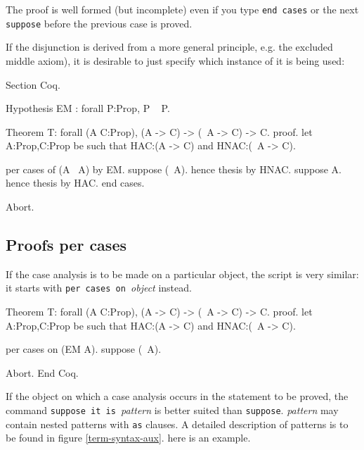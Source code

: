 The proof is well formed (but incomplete) even if you type {\tt end
 cases} or the next {\tt suppose} before the previous case is proved.

If the disjunction is derived from a more general principle, e.g. the
excluded middle axiom), it is desirable to just specify which instance
of it is being used:

\begin{coq_eval}
Section Coq.
\end{coq_eval}
\begin{coq_example}
Hypothesis EM : forall P:Prop, P \/ ~ P.
\end{coq_example} 
\begin{coq_eval}
Theorem T: forall (A C:Prop), (A -> C) -> (~A -> C) -> C.
proof.
let A:Prop,C:Prop be such that HAC:(A -> C) and HNAC:(~A -> C).
\end{coq_eval} 
\begin{coq_example}
per cases of (A \/ ~A) by EM.
suppose (~A).
  hence thesis by HNAC.
suppose A.
  hence thesis by HAC.
end cases.
\end{coq_example}
\begin{coq_eval}
Abort.
\end{coq_eval}

\subsection{Proofs per cases}

If the case analysis is to be made on a particular object, the script
is very similar: it starts with {\tt per cases on }\emph{object} instead.

\begin{coq_eval}
Theorem T: forall (A C:Prop), (A -> C) -> (~A -> C) -> C.
proof.
let A:Prop,C:Prop be such that HAC:(A -> C) and HNAC:(~A -> C).
\end{coq_eval} 
\begin{coq_example}
per cases on (EM A).
suppose (~A).
\end{coq_example}
\begin{coq_eval}
Abort.
End Coq.
\end{coq_eval}

If the object on which a case analysis occurs in the statement to be
proved, the command {\tt suppose it is }\emph{pattern} is better
suited than {\tt suppose}. \emph{pattern} may contain nested patterns
with {\tt as} clauses. A detailed description of patterns is to be
found in figure \ref{term-syntax-aux}. here is an example.

